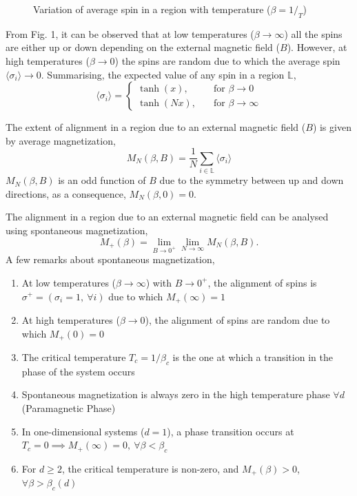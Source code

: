 \documentclass[letterpaper,english,10pt]{article}
\begin{document}
\begin{defn}
\begin{figure}
\caption{Variation of average spin in a region with temperature ($\beta = 1/_T$)}
\end{figure}
From Fig. 1, it can be observed that at low temperatures ($\beta \to \infty$) all the spins are either up or down depending on the external magnetic field ($B$). However, at high temperatures ($\beta \to 0$) the spins are random due to which the average spin $\langle \sigma_{i}\rangle \to 0$. Summarising, the expected value of any spin in a region $\mathbb{L}$,	
	\[\langle\sigma_{i}\rangle =
	\begin{cases}
	\tanh(x), & \quad \text{for } \beta \to 0 \\
	\tanh(Nx), & \quad \text{for } \beta \to \infty
	\end{cases}	\]
\end{defn}
\begin{defn} The extent of alignment in a region due to an external magnetic field ($B$) is given by average magnetization,
	$$M_{N}(\beta,B)=\frac{1}{N}\sum_{i\in \mathbb{L}}\langle\sigma_{i}\rangle$$
$M_{N}(\beta,B)$ is an odd function of $B$ due to the symmetry between up and down directions, as a consequence, $M_{N}(\beta,0) = 0$. 

\end{defn}

\begin{defn} The alignment in a region due to an external magnetic field can be analysed using spontaneous magnetization,
$$M_{+}(\beta) = \lim \limits_{B \rightarrow 0^{+}}\limits \lim_{N\rightarrow\infty}M_{N}(\beta,B).$$
A few remarks about spontaneous magnetization,
\begin{enumerate}
	\item At low temperatures ($\beta \to \infty$) with $B \to 0^{+}$, the alignment of spins is $\sigma^{+} = (\sigma_{i} = 1,~\forall i)$ due to which $M_{+}(\infty) = 1$
	\item At high temperatures ($\beta \to 0$), the alignment of spins are random due to which $M_{+}(0) = 0$
	\item The critical temperature $T_{c} = 1/\beta_{c}$ is the one at which  a transition in the phase of the system occurs
	\item Spontaneous magnetization is always zero in the high temperature phase $\forall d$ (Paramagnetic Phase)
	\item In one-dimensional systems ($d=1$), a phase transition occurs at $T_{c} = 0 \implies M_{+}(\infty) = 0,~\forall \beta < \beta_{c}$
	\item For $d\geq 2$, the critical temperature is non-zero, and $M_{+}(\beta)>0$, $\forall \beta > \beta_{c}(d)$
	\end{enumerate}
\end{defn}
\end{document}

